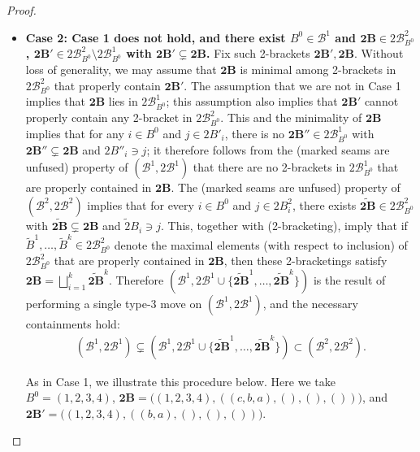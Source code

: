 \documentclass[11pt]{amsart}
\theoremstyle{definition}
\theoremstyle{remark}
\theoremstyle{plain}
\newcommand{\btB}{{\mathbf{2B}}}
\newcommand{\sB}{\mathscr{B}}
\newcommand{\stB}{2\mathscr{B}}
\newcommand{\wt}{\widetilde}
\begin{document}
\begin{proof}
\begin{itemize}

\item[] {\bf Case 2: Case 1 does not hold, and there exist $B^0 \in \sB^1$ and $\btB \in \stB^2_{B^0}$, $\btB' \in \stB^2_{B^0}\setminus \stB^1_{B^0}$ with $\btB' \subsetneq \btB$.}
Fix such 2-brackets $\btB', \btB$.
Without loss of generality, we may assume that $\btB$ is minimal among 2-brackets in $\stB^2_{B^0}$ that properly contain $\btB'$.
The assumption that we are not in Case 1 implies that $\btB$ lies in $\stB^1_{B^0}$; this assumption also implies that $\btB'$ cannot properly contain any 2-bracket in $\stB^2_{B^0}$.
This and the minimality of $\btB$ implies that for any $i \in B^0$ and $j \in 2B'_i$, there is no $\btB'' \in \stB^1_{B^0}$ with $\btB'' \subsetneq \btB$ and $2B''_i \ni j$; it therefore follows from the {\sc(marked seams are unfused)} property of $(\sB^1,\stB^1)$ that there are no 2-brackets in $\stB^1_{B^0}$ that are properly contained in $\btB$.
The {\sc(marked seams are unfused)} property of $(\sB^2,\stB^2)$ implies that for every $i \in B^0$ and $j \in 2B^2_i$, there exists $\wt \btB \in \stB^2_{B^0}$ with $\wt\btB \subsetneq \btB$ and $\wt 2B_i \ni j$.
This, together with {\sc(2-bracketing)}, imply that if $\wt B^1, \ldots, \wt B^k \in \stB^2_{B^0}$ denote the maximal elements (with respect to inclusion) of $\stB^2_{B^0}$ that are properly contained in $\btB$, then these 2-bracketings satisfy $\btB = \bigsqcup_{i=1}^k \wt \btB^k$.
Therefore $(\sB^1,\stB^1\cup\{\wt\btB^1,\ldots,\wt\btB^k\})$ is the result of performing a single type-3 move on $(\sB^1,\stB^1)$, and the necessary containments hold:
\begin{align}
(\sB^1,\stB^1) \subsetneq (\sB^1,\stB^1\cup\{\wt\btB^1,\ldots,\wt\btB^k\}) \subset (\sB^2,\stB^2).
\end{align}


As in Case 1, we illustrate this procedure below.
Here we take $B^0 = (1,2,3,4)$, $\btB = \bigl((1,2,3,4),((c,b,a),(),(),())\bigr)$, and $\btB' = \bigl((1,2,3,4),((b,a),(),(),())\bigr)$.

\begin{figure}[H]
\centering
\def\svgwidth{1.0\columnwidth}

\label{fig:2nu_poset_map_example_2}
\end{figure}


\medskip


\end{itemize}
\end{proof}
\end{document}
